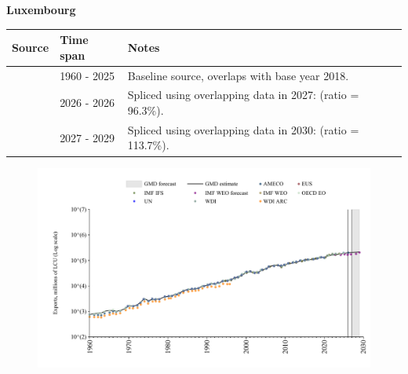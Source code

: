 \documentclass[12pt,a4paper,landscape]{article}
\begin{document}
\begin{adjustbox}{max totalsize={\paperwidth}{\paperheight},center}
\begin{minipage}[t][\textheight][t]{\textwidth}
\vspace*{0.5cm}
{}
\begin{center}
{\Large\bfseries Luxembourg}
\end{center}
\vspace{0.5cm}
\begin{table}[H]
\centering
\small
\begin{tabular}{|l|l|l|}
\hline
\textbf{Source} & \textbf{Time span} & \textbf{Notes} \\
\hline
\rowcolor{white}\cite{OECD_EO}& 1960 - 2025 &Baseline source, overlaps with base year 2018.\\
\rowcolor{lightgray}\cite{AMECO}& 2026 - 2026 &Spliced using overlapping data in 2027: (ratio = 96.3\%).\\
\rowcolor{white}\cite{IMF_WEO_forecast}& 2027 - 2029 &Spliced using overlapping data in 2030: (ratio = 113.7\%).\\
\hline
\end{tabular}
\end{table}
\begin{figure}[H]
\centering
\includegraphics[width=\textwidth,height=0.6\textheight,keepaspectratio]{graphs/LUX_exports.pdf}
\end{figure}
\end{minipage}
\end{adjustbox}
\end{document}
